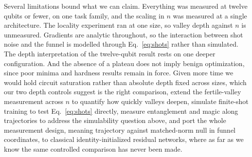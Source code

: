 \documentclass[conference]{IEEEtran}%
\begin{document}
Several limitations bound what we can claim. Everything was measured at twelve qubits or fewer, on one task family, and the scaling in $n$ was measured at a single architecture. The locality experiment ran at one size, so valley depth against $n$ is unmeasured. Gradients are analytic throughout, so the interaction between shot noise and the funnel is modelled through Eq.~\eqref{eq:shots} rather than simulated. The depth interpretation of the twelve-qubit result rests on one deeper configuration. And the absence of a plateau does not imply benign optimization, since poor minima and hardness results \cite{anschuetz,bittel} remain in force. Given more time we would hold circuit saturation rather than absolute depth fixed across sizes, which our two depth controls suggest is the right comparison, extend the fertile-valley measurement across $n$ to quantify how quickly valleys deepen, simulate finite-shot training to test Eq.~\eqref{eq:shots} directly, measure entanglement and magic along trajectories to address the simulability question above, and port the whole measurement design, meaning trajectory against matched-norm null in funnel coordinates, to classical identity-initialized residual networks, where as far as we know the same controlled comparison has never been made.
\end{document}
